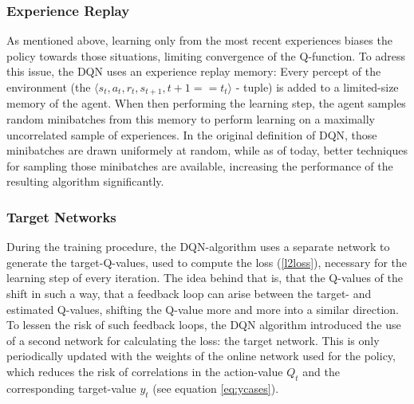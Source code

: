\subsubsection{Experience Replay}
As mentioned above, learning only from the most recent experiences biases the policy towards those situations, limiting convergence of the Q-function. To adress this issue, the DQN uses an experience replay memory: Every percept of the environment (the $\langle s_t, a_t, r_t, s_{t+1}, t+1==t_t \rangle$ - tuple) is added to a limited-size memory of the agent. When then performing the learning step, the agent samples random minibatches from this memory to perform learning on a maximally uncorrelated sample of experiences. In the original definition of DQN, those minibatches are drawn uniformely at random, while as of today, better techniques for sampling those minibatches are available\cite{schaul_prioritized_2015}, increasing the performance of the resulting algorithm significantly. %

\subsubsection{Target Networks}
During the training procedure, the DQN-algorithm uses a separate network to generate the target-Q-values, used to compute the loss (\ref{l2loss}), necessary for the learning step of every iteration. The idea behind that is, that the Q-values of the  shift in such a way, that a feedback loop can arise between the target- and estimated Q-values, shifting the Q-value more and more into a similar direction. %
To lessen the risk of such feedback loops, the DQN algorithm introduced the use of a second network for calculating the loss: the target network. This is only periodically updated with the weights of the online network used for the policy, which reduces the risk of correlations in the action-value $Q_t$ and the corresponding target-value $y_t$ (see equation \ref{eq:ycases}).

